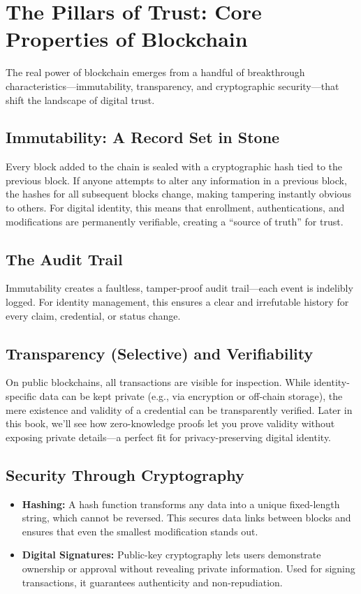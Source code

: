 \section{The Pillars of Trust: Core Properties of Blockchain}
The real power of blockchain emerges from a handful of breakthrough characteristics—immutability, transparency, and cryptographic security—that shift the landscape of digital trust.

\subsection*{Immutability: A Record Set in Stone}
Every block added to the chain is sealed with a cryptographic hash tied to the previous block. If anyone attempts to alter any information in a previous block, the hashes for all subsequent blocks change, making tampering instantly obvious to others. For digital identity, this means that enrollment, authentications, and modifications are permanently verifiable, creating a “source of truth” for trust.

\subsection*{The Audit Trail}
Immutability creates a faultless, tamper-proof audit trail—each event is indelibly logged. For identity management, this ensures a clear and irrefutable history for every claim, credential, or status change.

\subsection*{Transparency (Selective) and Verifiability}
On public blockchains, all transactions are visible for inspection. While identity-specific data can be kept private (e.g., via encryption or off-chain storage), the mere existence and validity of a credential can be transparently verified. Later in this book, we’ll see how zero-knowledge proofs let you prove validity without exposing private details—a perfect fit for privacy-preserving digital identity.

\subsection*{Security Through Cryptography}
\begin{itemize}
    \item \textbf{Hashing:} A hash function transforms any data into a unique fixed-length string, which cannot be reversed. This secures data links between blocks and ensures that even the smallest modification stands out.
    \item \textbf{Digital Signatures:} Public-key cryptography lets users demonstrate ownership or approval without revealing private information. Used for signing transactions, it guarantees authenticity and non-repudiation.
\end{itemize}

